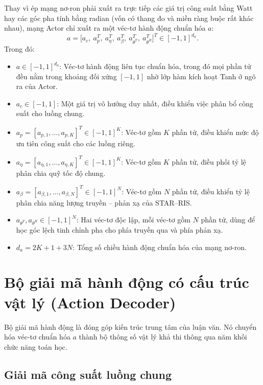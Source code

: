 Thay vì ép mạng nơ-ron phải xuất ra trực tiếp các giá trị công suất bằng Watt hay các góc pha tính bằng radian
(vốn có thang đo và miền ràng buộc rất khác nhau), mạng Actor chỉ xuất ra một véc-tơ hành động chuẩn hóa $a$:
\begin{equation}
a = \big[a_c,\ a_p^T,\ a_\eta^T,\ a_\beta^T,\ a_{\theta^T}^T,\ a_{\theta^R}^T\big]^T \in [-1, 1]^{d_a}.
\label{eq:vec-to-hanh-dong}
\end{equation}
Trong đó:
\begin{itemize}
\item $a \in [-1, 1]^{d_a}$: Véc-tơ hành động liên tục chuẩn hóa, trong đó mọi phần tử đều nằm trong khoảng đối
  xứng $[-1, 1]$ nhờ lớp hàm kích hoạt Tanh ở ngõ ra của Actor.
\item $a_c \in [-1, 1]$: Một giá trị vô hướng duy nhất, điều khiển việc phân bổ công suất cho luồng chung.
\item $a_p = [a_{p,1}, \dots, a_{p,K}]^T \in [-1, 1]^K$: Véc-tơ gồm $K$ phần tử, điều khiển mức độ ưu tiên công
  suất cho các luồng riêng.
\item $a_\eta = [a_{\eta,1}, \dots, a_{\eta,K}]^T \in [-1, 1]^K$: Véc-tơ gồm $K$ phần tử, điều phối tỷ lệ phân
  chia quỹ tốc độ chung.
\item $a_\beta = [a_{\beta,1}, \dots, a_{\beta,N}]^T \in [-1, 1]^N$: Véc-tơ gồm $N$ phần tử, điều khiển tỷ lệ
  phân chia năng lượng truyền -- phản xạ của STAR--RIS.
\item $a_{\theta^T}, a_{\theta^R} \in [-1, 1]^N$: Hai véc-tơ độc lập, mỗi véc-tơ gồm $N$ phần tử, dùng để học
  góc lệch tinh chỉnh pha cho phía truyền qua và phía phản xạ.
\item $d_a = 2K + 1 + 3N$: Tổng số chiều hành động chuẩn hóa của mạng nơ-ron.
\end{itemize}

\section{Bộ giải mã hành động có cấu trúc vật lý (Action Decoder)}
\label{sec:bo-giai-ma}

Bộ giải mã hành động là đóng góp kiến trúc trung tâm của luận văn. Nó chuyển hóa véc-tơ chuẩn hóa $a$ thành bộ
thông số vật lý khả thi thông qua năm khối chức năng toán học.

\subsection{Giải mã công suất luồng chung}
\label{ssec:giai-ma-cong-suat-chung}

